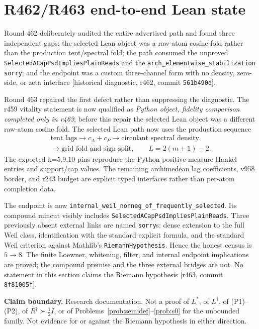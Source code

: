 \documentclass[11pt]{article}
\theoremstyle{remark}
\newcommand{\Rd}{R^{\dagger}}
\newcommand{\Ld}{L^{\dagger}}
\newcommand{\Ls}{L^{*}}
\newcommand{\half}{\tfrac12}
\newcommand{\gr}[1]{\textnormal{\small[#1]}}
\begin{document}
\section{R462/R463 end-to-end Lean state}\label{sec:r463-fidelity}

Round 462 deliberately audited the entire advertised path and found
three independent gaps: the selected Lean object was a raw-atom
cosine fold rather than the production tent/spectral fold; the path
consumed the unproved
\texttt{SelectedACapPsdImpliesPlainReads} and the
\texttt{arch\_elementwise\_stabilization} \texttt{sorry}; and the
endpoint was a custom three-channel form with no density, zero-side,
or zeta interface \gr{historical diagnostic, r462,
commit \texttt{561b490d}}.

Round 463 repaired the first defect rather than suppressing the
diagnostic.  The r459 vitality statement is now qualified as
\emph{Python object, fidelity comparison completed only in r463};
before this repair the selected Lean object was a different raw-atom
cosine fold.  The selected Lean path now uses the production sequence
\[
  \begin{gathered}
  \text{tent lags}\longrightarrow c_A+c_P
  \longrightarrow\text{circulant spectral density}\\
  {}\longrightarrow\text{grid fold and sign split},
  \qquad L=2(m+1)-2.
  \end{gathered}
\]
The exported k=5,9,10 pins reproduce the Python positive-measure
Hankel entries and support/cap values.  The remaining archimedean
lag coefficients, v958 border, and r243 budget are explicit typed
interfaces rather than per-atom completion data.

The endpoint is now
\texttt{internal\_weil\_nonneg\_of\_frequently\_selected}.
Its compound mincut visibly includes
\texttt{SelectedACapPsdImpliesPlainReads}.  Three previously absent
external links are named \texttt{sorry}s: dense extension to the full
Weil class, identification with the standard explicit formula, and
the standard Weil criterion against Mathlib's
\texttt{RiemannHypothesis}.  Hence the honest census is $5\to8$.
The finite Loewner, whitening, filter, and internal endpoint
implications are proved; the compound premise and the three external
bridges are not.  No statement in this section claims the Riemann
hypothesis \gr{r463, commit \texttt{8f81005f}}.

\medskip\noindent
\textbf{Claim boundary.}\enspace
Research documentation.  Not a proof of $\Ls$, of $\Ld$, of
\textup{(P1)}--\textup{(P2)}, of $\Rd\succ\half I$, or of
Problems~\ref{prob:semidef}--\ref{prob:s0} for the
unbounded family.  Not evidence for or against the Riemann
hypothesis in either direction.
\end{document}
